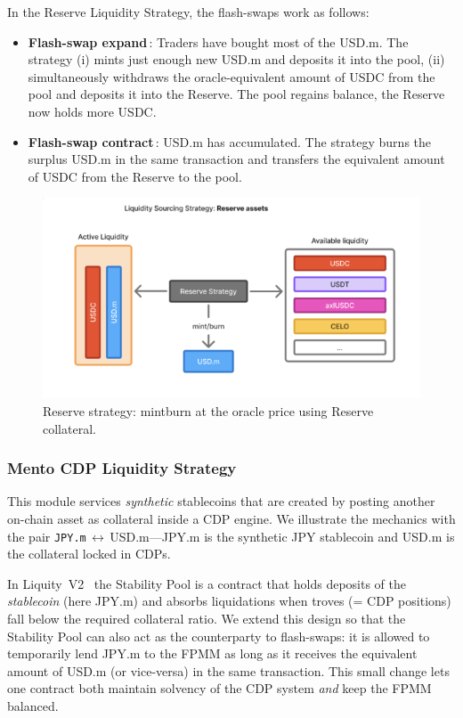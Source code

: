 \documentclass[a4paper]{article}
\providecommand{\hyp}{-}
\theoremstyle{definition}
\begin{document}
In the Reserve Liquidity Strategy, the flash\hyp swaps work as follows:
\begin{itemize}
  \item \textbf{Flash\hyp swap expand}\,: Traders have bought most of the USD.m.
        The strategy (i) mints just enough new USD.m and deposits it into the
        pool, (ii) simultaneously withdraws the oracle\hyp equivalent amount of
        USDC from the pool and deposits it into the Reserve.  The pool regains balance, the Reserve now holds
        more USDC.
  \item \textbf{Flash\hyp swap contract}\,: USD.m has accumulated.  The strategy
        burns the surplus USD.m in the same transaction and transfers the
        equivalent amount of USDC from the Reserve to the pool.
\end{itemize}
\begin{figure}[ht]
    \centering
    \includegraphics[width=0.6\linewidth]{figures/fpmm_3.png}
    \caption{Reserve strategy: mint\/burn at the oracle price using Reserve collateral.}
\end{figure}

\subsubsection{Mento CDP Liquidity Strategy}\label{str:cdp}
This module services \emph{synthetic} stablecoins that
are created by posting another on-chain asset as collateral inside a CDP
engine.  We illustrate the mechanics with the pair
\texttt{JPY.m}\,$\leftrightarrow$\,USD.m—JPY.m is the synthetic JPY stablecoin
and USD.m is the collateral locked in CDPs.

In Liquity~V2~\cite{liquity_v2} the Stability Pool is a
contract that holds deposits of the \emph{stablecoin} (here JPY.m) and absorbs
liquidations when troves (= CDP positions) fall below the required collateral ratio.  We extend
this design so that the Stability Pool can also act as the counterparty to
flash-swaps: it is allowed to temporarily lend JPY.m to the FPMM as long as it
receives the equivalent amount of USD.m (or vice-versa) in the same
transaction.  This small change lets one contract both maintain solvency of the
CDP system \emph{and} keep the FPMM balanced.\\
\end{document}
